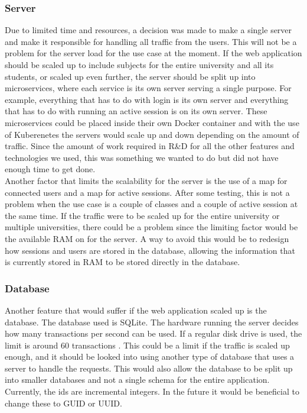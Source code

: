 \subsubsection{Server}
Due to limited time and resources, a decision was made to make a single server and make it responsible for handling all traffic from the users. This will not be a problem for the server load for the use case at the moment. If the web application should be scaled up to include subjects for the entire university and all its students, or scaled up even further, the server should be split up into microservices, where each service is its own server serving a single purpose. For example, everything that has to do with login is its own server and everything that has to do with running an active session is on its own server. These microservices could be placed inside their own Docker\cite{Docker:Info} container and with the use of Kuberenetes\cite{Kubernetes:Info} the servers would scale up and down depending on the amount of traffic. Since the amount of work required in R\&D for all the other features and technologies we used, this was something we wanted to do but did not have enough time to get done.
\\[11pt]
Another factor that limits the scalability for the server is the use of a map for connected users and a map for active sessions. After some testing, this is not a problem when the use case is a couple of classes and a couple of active session at the same time. If the traffic were to be scaled up for the entire university or multiple universities, there could be a problem since the limiting factor would be the available RAM on for the server. A way to avoid this would be to redesign how sessions and users are stored in the database, allowing the information that is currently stored in RAM to be stored directly in the database. 
\subsubsection{Database}
Another feature that would suffer if the web application scaled up is the database. The database used is SQLite. The hardware running the server decides how many transactions per second can be used. If a regular disk drive is used, the limit is around 60 transactions \cite{SQLite:faqQ19}. This could be a limit if the traffic is scaled up enough, and it should be looked into using another type of database that uses a server to handle the requests. This would also allow the database to be split up into smaller databases and not a single schema for the entire application. Currently, the ids are incremental integers. In the future it would be beneficial to change these to GUID or UUID.\cite{UUIDE}
